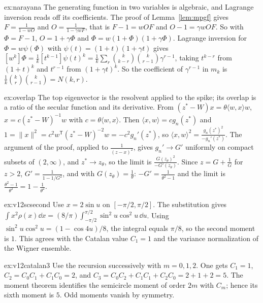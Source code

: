 \begin{solution}{ex:narayana}
\idea The generating function in two variables is algebraic, and Lagrange inversion reads off its coefficients.
\writeup The proof of Lemma~\ref{lem:mpgf} gives $F=\frac1{1-wO}$ and $O=\frac1{1-\gamma wF}$, that is $F-1=wOF$ and $O-1=\gamma wOF$. So with $\Phi=F-1$, $O=1+\gamma\Phi$ and $\Phi=w(1+\Phi)(1+\gamma\Phi)$. Lagrange inversion for $\Phi=w\psi(\Phi)$ with $\psi(t)=(1+t)(1+\gamma t)$ gives $[w^k]\Phi=\frac1k[t^{k-1}]\psi(t)^k=\frac1k\sum_{r}\binom k{k-r}\binom k{r-1}\gamma^{r-1}$, taking $t^{k-r}$ from $(1+t)^k$ and $t^{r-1}$ from
$(1+\gamma t)^k$. So the coefficient of $\gamma^{r-1}$ in $m_k$ is $\frac1k\binom kr\binom k{r-1}=N(k,r)$.
\end{solution}

\begin{solution}{ex:overlap}
\idea The top eigenvector is the resolvent applied to the spike; its overlap is a ratio of the secular function and its derivative.
\writeup From $(z^*-W)x=\theta\langle w,x\rangle w$, $x=c(z^*-W)^{-1}w$ with $c=\theta\langle w,x\rangle$. Then $\langle x,w\rangle=cg_n(z^*)$ and $1=\|x\|^2=c^2w^{\mathsf T}(z^*-W)^{-2}w=-c^2g_n'(z^*)$, so
$\langle x,w\rangle^2=\frac{g_n(z^*)^2}{-g_n'(z^*)}$. The argument of the proof, applied to $\frac1{(z-x)^2}$, gives $g_n'\to G'$ uniformly on compact subsets of $(2,\infty)$, and $z^*\to z_\theta$, so the limit is
$\frac{G(z_\theta)^2}{-G'(z_\theta)}$. Since $z=G+\frac1G$ for $z>2$, $G'=\frac1{1-1/G^2}$, and with $G(z_\theta)=\frac1\theta$: $-G'=\frac1{\theta^2-1}$ and the limit is $\frac{\theta^2-1}{\theta^2}=1-\frac1{\theta^2}$.
\end{solution}

\begin{solution}{ex:v12scsecond}
\idea Use $x=2\sin u$ on $[-\pi/2,\pi/2]$.
\writeup The substitution gives $\int x^2\rho(x)\dd x=(8/\pi)\int_{-\pi/2}^{\pi/2}\sin^2u\cos^2u\,\dd u$. Using $\sin^2u\cos^2u=(1-\cos4u)/8$, the integral equals $\pi/8$, so the second moment is $1$. This agrees with the Catalan value $C_1=1$ and the variance normalization of the Wigner ensemble.
\end{solution}

\begin{solution}{ex:v12catalan3}
\idea Use the recursion successively with $m=0,1,2$.
\writeup One gets $C_1=1$, $C_2=C_0C_1+C_1C_0=2$, and $C_3=C_0C_2+C_1C_1+C_2C_0=2+1+2=5$. The moment theorem identifies the semicircle moment of order $2m$ with $C_m$; hence its sixth moment is $5$. Odd moments vanish by symmetry.
\end{solution}

